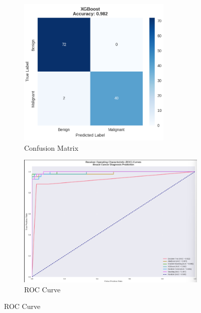 \documentclass[11pt]{article}
\begin{document}
\begin{figure}[H]
\centering
\begin{subfigure}{0.45\textwidth}
  \centering
  \includegraphics[width=\linewidth]{f3.png}
  \caption{Confusion Matrix}
\end{subfigure}
\hfill
\begin{subfigure}{0.45\textwidth}
  \centering
  \includegraphics[width=\linewidth]{x1.png}
  \caption{ROC Curve}
\end{subfigure}

\end{figure}
\end{document}
